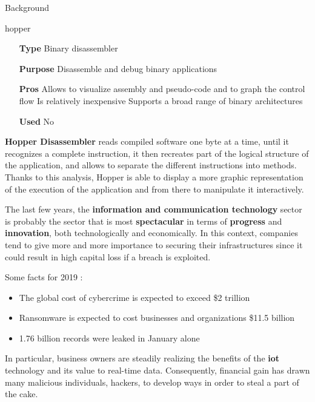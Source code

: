 \begin{chaptercover}{Background}
\begin{solutiondata}{hopper}
\begin{itemize}[labelsep=1cm]
  \item [\textbf{Type}] Binary disassembler
  \item [\textbf{Purpose}] Disassemble and debug binary applications
  \item [\textbf{Pros}] Allows to visualize assembly and pseudo-code and to graph the control flow \newline Is relatively inexpensive \newline Supports a broad range of binary architectures
  \item [\textbf{Used}] No
\end{itemize}
\end{solutiondata}

\textbf{Hopper Disassembler} \cite{hopper} reads compiled software one byte at a time, until it recognizes a complete instruction, it then recreates part of the logical structure of the application, and allows to separate the different instructions into methods. Thanks to this analysis, Hopper is able to display a more graphic representation of the execution of the application and from there to manipulate it interactively.

\begin{summary}
The last few years, the \textbf{information and communication technology} sector is probably the sector that is most \textbf{spectacular} in terms of \textbf{progress} and \textbf{innovation}, both technologically and economically. In this context, companies tend to give more and more importance to securing their infrastructures since it could result in high capital loss if a breach is exploited.

Some facts for 2019 : \cite{facts-and-figures} \vspace{-.3cm}
\begin{itemize}[itemsep=.1cm,labelsep=.1cm]
  \item The global cost of cybercrime is expected to exceed \$2 trillion
  \item Ransomware is expected to cost businesses and organizations \$11.5 billion
  \item 1.76 billion records were leaked in January alone
\end{itemize}

In particular, business owners are steadily realizing the benefits of the \textbf{\acrfull{iot}} technology and its value to real-time data. Consequently, financial gain has drawn many malicious individuals, hackers, to develop ways in order to steal a part of the cake.


\end{summary}
\end{chaptercover}
